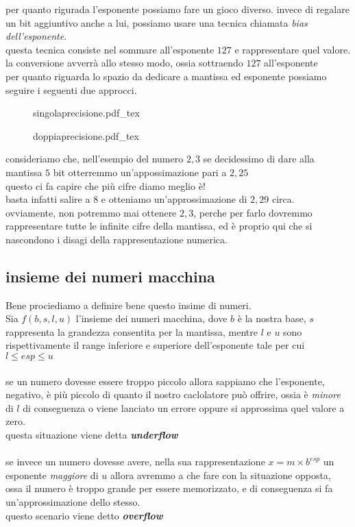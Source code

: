 \documentclass{article}
\newcommand{\incfig}[1]{%
    \def\svgwidth{\columnwidth}
    {#1.pdf_tex}
}
\newcommand{\vs}{
\vspace{1cm}
}
\begin{document}
per quanto rigurada l'esponente possiamo fare un gioco diverso. invece di regalare un bit aggiuntivo anche a lui, possiamo usare una tecnica chiamata \textit{bias dell'esponente}.\\ 
questa tecnica consiste nel sommare all'esponente $127$ e rappresentare quel valore. la conversione avverrà allo stesso modo, ossia sottraendo $127$ all'esponente \\ 
per quanto riguarda lo spazio da dedicare a mantissa ed esponente possiamo seguire i seguenti due approcci.
\newpage
\begin{figure}
    \centering
    \begin{tcolorbox}[arc=4pt]
      \centering
      \incfig{singolaprecisione} \\
    \end{tcolorbox}
    \vs
    \begin{tcolorbox}[arc=4pt]
      \centering
      \incfig{doppiaprecisione} 
    \end{tcolorbox}
\end{figure}

consideriamo che, nell'esempio del numero $2,3$ se decidessimo di dare alla mantissa $5$ bit otterremmo un'appossimazione pari a $2,25$\\ 
questo ci fa capire che più cifre diamo meglio è! \\ 
basta infatti salire a $8$ e otteniamo un'approssimazione di $2,29$ circa. \\ 
ovviamente, non potremmo mai ottenere $2,3$, perche per farlo dovremmo rappresentare tutte le infinite cifre della mantissa, ed è proprio qui che si nascondono i disagi della rappresentazione numerica.   

 
\subsection{insieme dei numeri macchina} 
Bene prociediamo a definire bene questo insime di numeri. \\
Sia $f(b,s,l,u)$ l'insieme dei numeri macchina, dove $b$ è la nostra base, $s$ rappresenta la grandezza consentita per la mantissa, mentre $l$ e $u$ sono rispettivamente il range inferiore e superiore dell'esponente tale per cui $l  \leqslant esp  \leqslant u$ \\ \\
se un numero dovesse essere troppo piccolo allora sappiamo che l'esponente, negativo, è più piccolo di quanto il nostro caclolatore può offrire, ossia è \textit{minore} di $l$  di conseguenza o viene lanciato un errore oppure si approssima quel valore a zero.\\ 
questa situazione viene detta \textbf{\textit{underflow}}\\ \\ 
se invece un numero dovesse avere, nella sua rappresentazione $x = m \times b^{esp}$ un esponente \textit{maggiore} di $u$ allora avremmo a che fare con la situazione opposta, ossa il numero è troppo grande per essere memorizzato, e di conseguenza si fa un'approssimazione dello stesso.\\
questo scenario viene detto \textbf{\textit{overflow}}\\ \\ 
\end{document}
